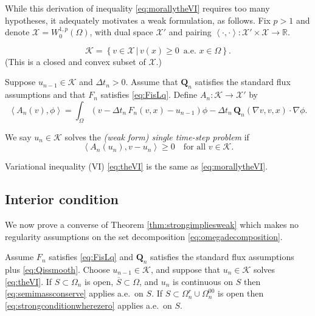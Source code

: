 \documentclass[final,onefignum]{siamart190516}
\newcommand\bQ{\mathbf{Q}}
\newcommand{\grad}{\nabla}
\newcommand{\ip}[2]{\ensuremath{\left<#1,#2\right>}}
\newcommand\RR{\mathbb{R}}
\begin{document}
While this derivation of inequality \eqref{eq:morallytheVI} requires too many hypotheses, it adequately motivates a weak formulation, as follows.  Fix $p>1$ and denote $\mathcal{X} = W_0^{1,p}(\Omega)$, with dual space $\mathcal{X}'$ and pairing $\ip{\cdot}{\cdot}: \mathcal{X}' \times \mathcal{X} \to \RR$.

\begin{definition}
\begin{equation}
\mathcal{K} = \left\{v \in \mathcal{X} \,\big|\, v(x) \ge 0\, \text{ a.e.~} x \in \Omega\right\}.  \label{eq:defineK}
\end{equation}
(This is a closed and convex subset of $\mathcal{X}$.)
\end{definition}

\begin{definition}  Suppose $u_{n-1}\in\mathcal{K}$ and $\Delta t_n>0$.  Assume that $\bQ_n$ satisfies the standard flux assumptions and that $F_n$ satisfies \eqref{eq:FisLq}.  Define $A_n:\mathcal{K} \to \mathcal{X}'$ by
\begin{equation}
  \ip{A_n(v)}{\phi} = \int_\Omega \left(v - \Delta t_n\, F_n(v,x) - u_{n-1}\right)\phi - \Delta t_n\, \bQ_n(\grad v,v,x) \cdot \grad\phi. \label{eq:defineAn}
\end{equation}
\end{definition}

\begin{definition}  We say $u_n\in\mathcal{K}$ solves the \emph{(weak form) single time-step problem} if
\begin{equation}
  \ip{A_n(u_n)}{v-u_n} \ge 0 \quad \text{for all } v \in \mathcal{K}.  \label{eq:theVI}
\end{equation}
\end{definition}

Variational inequality (VI) \eqref{eq:theVI} is the same as \eqref{eq:morallytheVI}.


\subsection{Interior condition}  \label{subsec:interior}  We now prove a converse of Theorem \ref{thm:strongimpliesweak} which makes no regularity assumptions on the set decomposition \eqref{eq:omegadecomposition}.

\begin{theorem} \label{thm:weakimpliesstrong}  Assume $F_n$ satisfies \eqref{eq:FisLq} and $\bQ_n$ satisfies the standard flux assumptions plus \eqref{eq:Qissmooth}.  Choose $u_{n-1}\in\mathcal{K}$, and suppose that $u_n\in\mathcal{K}$ solves \eqref{eq:theVI}.  If $S \subset \Omega_n$ is open, $\overline{S}\subset \Omega$, and $u_n$ is continuous on $S$ then \eqref{eq:semimassconserve} applies a.e.~on $S$.  If $S \subset \Omega_n^r \cup \Omega_n^{00}$ is open then \eqref{eq:strongconditionwherezero} applies a.e.~on $S$.
\end{theorem}
\end{document}
